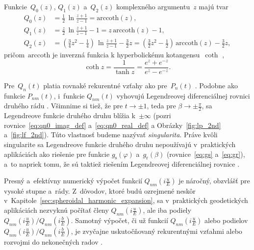 \documentclass[a4paper, 12pt]{book}
\begin{document}
Funkcie~$Q_0\left( z \right)$, $Q_1\left( z \right)$ a~$Q_2\left( z \right)$ 
komplexného argumentu~$z$ majú tvar
%
\begin{align}
\label{eq:q0z}
Q_0(z) &= \frac{1}{2} \, \ln\frac{z + 1}{z - 1} = \mathrm{arccoth}(z){,}\\
%
\label{eq:q1z}
Q_1(z) &= \frac{z}{2} \, \ln\frac{z + 1}{z - 1} - 1 = z \, \mathrm{arccoth}(z)- 
 1{,}\\
%
\label{eq:q2z}
Q_2(z) &= \left( \frac{3}{4} z^2 - \frac{1}{4} \right) \, \ln\frac{z + 1}{z 
- 1} - \frac{3}{2}z = \left( \frac{3}{2} z^2 - \frac{1}{2} \right) \, 
\mathrm{arccoth}(z) - \frac{3}{2}z{,}
\end{align}
%
pričom~$\mathrm{arccoth}$ je inverzná funkcia k hyperbolickému 
kotangensu~$\coth$ \parencite{Gradshteyn2007},
%
\begin{equation}
\coth z = \frac{1}{\tanh z} =  \frac{e^z + e^{-z}}{e^z - e^{-z}}{.}
\end{equation}

Pre~$Q_n(t)$ platia rovnaké rekurentné vzťahy ako pre~$P_n(t)$ 
\parencite{MoritzPhysicalGeodesy}.  Podobne ako funkcie $P_{nm}(t)$, i~funkcie 
$Q_{nm}(t)$ vyhovujú Legendreovej diferenciálnej rovnici druhého rádu 
\parencite[pozri rovnicu
\ref{eq:legfunc1_differential_equation};][]{MoritzPhysicalGeodesy}.  Všimnime 
si tiež, že pre $t \rightarrow \pm 1$, teda pre $\beta \rightarrow \pm 
\frac{\pi}{2}$, sa Legendreove funkcie druhého druhu blížia k~$\pm \infty$ 
(pozri rovnice~\ref{eq:qn0_imag_def} a~\ref{eq:qn0_real_def} 
a Obrázky~\ref{fig:lp_2nd} a~\ref{fig:lf_2nd}).  Túto vlastnosť budeme nazývať 
\emph{singularita}.  Práve kvôli singularite sa Legendreove funkcie druhého 
druhu nepoužívajú v~praktických aplikáciách ako riešenie pre funkcie 
$g_\mathrm{s}(\varphi)$ a~$g_\mathrm{r}(\beta)$ (rovnice~\ref{eq:gs} 
a~\ref{eq:gr}), a~to napriek tomu, že sú taktiež riešením Legendreovej 
diferenciálnej rovnice \parencite{MoritzPhysicalGeodesy}.

Presný a~efektívny numerický výpočet funkcií $Q_{nm}\left( i \frac{u}{E} 
\right)$ je náročný, obzvlášť pre vysoké stupne a~rády.  Z~dôvodov, ktoré budú 
ozrejmené neskôr v~Kapitole~\ref{sec:spheroidal_harmonic_expansion}, sa 
v~praktických geodetických aplikáciách nezvyknú počítať členy $Q_{nm}\left( 
i \frac{u}{E} \right)$, ale iba podiely $Q_{nm}\left( i \frac{u}{E} \right) 
\slash Q_{nm}\left( i \frac{b}{E} \right)$.  Samotný výpočet, či už funkcií 
$Q_{nm}\left( i \frac{u}{E} \right)$ alebo podielov $Q_{nm}\left( i \frac{u}{E} 
\right) \slash Q_{nm}\left( i \frac{b}{E} \right)$, je zvyčajne uskutočňovaný 
rekurentnými vzťahmi alebo rozvojmi do nekonečných radov \parencite[pozri 
napríklad][]{Sebera2012,Fukushima2013,Wang2013,Sprlak2020}.
\end{document}
